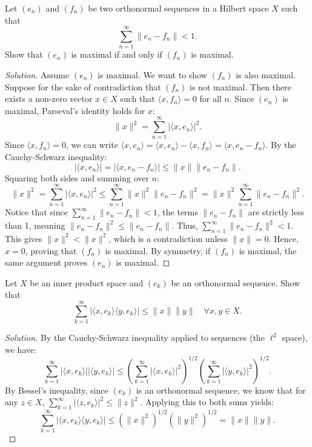 \documentclass{article}
\begin{document}
	\begin{problem}
		Let $(e_{n})$ and $(f_{n})$ be two orthonormal sequences in a Hilbert space $X$ such that 
		\[ \sum_{n=1}^{\infty} \|e_{n} - f_{n}\| < 1. \]
		Show that $(e_{n})$ is maximal if and only if $(f_{n})$ is maximal.
	\end{problem}
    \begin{proof}[Solution]
        Assume $(e_n)$ is maximal. We want to show $(f_n)$ is also maximal. Suppose for the sake of contradiction that $(f_n)$ is not maximal. Then there exists a non-zero vector $x \in X$ such that $\langle x, f_n \rangle = 0$ for all $n$.
        Since $(e_n)$ is maximal, Parseval's identity holds for $x$:
        \[ \|x\|^2 = \sum_{n=1}^\infty |\langle x, e_n \rangle|^2. \]
        Since $\langle x, f_n \rangle = 0$, we can write $\langle x, e_n \rangle = \langle x, e_n \rangle - \langle x, f_n \rangle = \langle x, e_n - f_n \rangle$.
        By the Cauchy-Schwarz inequality:
        \[ |\langle x, e_n \rangle| = |\langle x, e_n - f_n \rangle| \le \|x\| \|e_n - f_n\|. \]
        Squaring both sides and summing over $n$:
        \[ \|x\|^2 = \sum_{n=1}^\infty |\langle x, e_n \rangle|^2 \le \sum_{n=1}^\infty \|x\|^2 \|e_n - f_n\|^2 = \|x\|^2 \sum_{n=1}^\infty \|e_n - f_n\|^2. \]
        Notice that since $\sum_{n=1}^\infty \|e_n - f_n\| < 1$, the terms $\|e_n - f_n\|$ are strictly less than 1, meaning $\|e_n - f_n\|^2 \le \|e_n - f_n\|$. Thus, $\sum_{n=1}^\infty \|e_n - f_n\|^2 < 1$.
        This gives $\|x\|^2 < \|x\|^2$, which is a contradiction unless $\|x\| = 0$. Hence, $x = 0$, proving that $(f_n)$ is maximal.
        By symmetry, if $(f_n)$ is maximal, the same argument proves $(e_n)$ is maximal.
    \end{proof}

	\begin{problem}
		Let $X$ be an inner product space and $(e_{k})$ be an orthonormal sequence. Show that 
		\[ \sum_{k=1}^{\infty} |\langle x, e_{k} \rangle \langle y, e_{k} \rangle| \le \|x\| \|y\| \quad \forall x,y \in X. \]
	\end{problem}
    \begin{proof}[Solution]
        By the Cauchy-Schwarz inequality applied to sequences (the $\ell^2$ space), we have:
        \[ \sum_{k=1}^{\infty} |\langle x, e_{k} \rangle| |\langle y, e_{k} \rangle| \le \left( \sum_{k=1}^\infty |\langle x, e_k \rangle|^2 \right)^{1/2} \left( \sum_{k=1}^\infty |\langle y, e_k \rangle|^2 \right)^{1/2}. \]
        By Bessel's inequality, since $(e_k)$ is an orthonormal sequence, we know that for any $z \in X$, $\sum_{k=1}^\infty |\langle z, e_k \rangle|^2 \le \|z\|^2$.
        Applying this to both sums yields:
        \[ \sum_{k=1}^{\infty} |\langle x, e_{k} \rangle \langle y, e_{k} \rangle| \le \left( \|x\|^2 \right)^{1/2} \left( \|y\|^2 \right)^{1/2} = \|x\| \|y\|. \]
    \end{proof}
\end{document}
